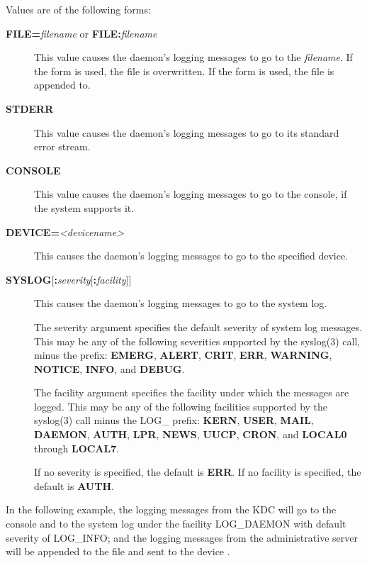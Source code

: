\documentclass[letterpaper,10pt,english]{sphinxmanual}
\begin{document}
Values are of the following forms:
\begin{description}
\item[{\textbf{FILE=}\emph{filename} or \textbf{FILE:}\emph{filename}}] \leavevmode
This value causes the daemon's logging messages to go to the
\emph{filename}.  If the \code{=} form is used, the file is overwritten.
If the \code{:} form is used, the file is appended to.

\item[{\textbf{STDERR}}] \leavevmode
This value causes the daemon's logging messages to go to its
standard error stream.

\item[{\textbf{CONSOLE}}] \leavevmode
This value causes the daemon's logging messages to go to the
console, if the system supports it.

\item[{\textbf{DEVICE=}\emph{\textless{}devicename\textgreater{}}}] \leavevmode
This causes the daemon's logging messages to go to the specified
device.

\item[{\textbf{SYSLOG}{[}\textbf{:}\emph{severity}{[}\textbf{:}\emph{facility}{]}{]}}] \leavevmode
This causes the daemon's logging messages to go to the system log.

The severity argument specifies the default severity of system log
messages.  This may be any of the following severities supported
by the syslog(3) call, minus the  prefix: \textbf{EMERG},
\textbf{ALERT}, \textbf{CRIT}, \textbf{ERR}, \textbf{WARNING}, \textbf{NOTICE}, \textbf{INFO},
and \textbf{DEBUG}.

The facility argument specifies the facility under which the
messages are logged.  This may be any of the following facilities
supported by the syslog(3) call minus the LOG\_ prefix: \textbf{KERN},
\textbf{USER}, \textbf{MAIL}, \textbf{DAEMON}, \textbf{AUTH}, \textbf{LPR}, \textbf{NEWS},
\textbf{UUCP}, \textbf{CRON}, and \textbf{LOCAL0} through \textbf{LOCAL7}.

If no severity is specified, the default is \textbf{ERR}.  If no
facility is specified, the default is \textbf{AUTH}.

\end{description}

In the following example, the logging messages from the KDC will go to
the console and to the system log under the facility LOG\_DAEMON with
default severity of LOG\_INFO; and the logging messages from the
administrative server will be appended to the file
 and sent to the device .
\end{document}
